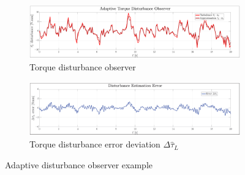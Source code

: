 \begin{figure}[hbtp]
\vspace{-6pt}
\centering
\begin{subfigure}{\textwidth}
\centering
\includegraphics[width=\textwidth]{graphs/disturbance_L}
\vspace{-8pt}
\caption{Torque disturbance observer}
\label{fig:disturbance_L}
\end{subfigure}
\begin{subfigure}{\textwidth}
\centering
\includegraphics[width=\textwidth]{graphs/error_LR}
\vspace{-8pt}
\caption{Torque disturbance error deviation $\Delta\hat{\tau}_L$}
\label{fig:error_LR}
\end{subfigure}
\vspace{-6pt}
\caption{Adaptive disturbance observer example}
\label{fig:example_L}
\vspace{-12pt}
\end{figure}
